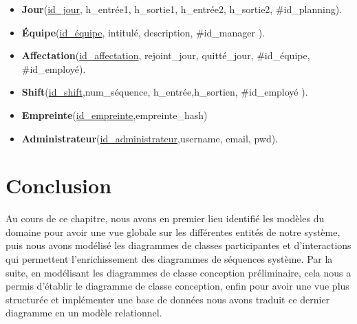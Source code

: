 \begin{itemize}
    \item [\textbullet]\textbf{Jour}(\underline{id\_jour}, h\_entrée1, h\_sortie1, h\_entrée2, h\_sortie2, \#id\_planning).
    
    \item [\textbullet]\textbf{Équipe}(\underline{id\_équipe}, intitulé, description, \#id\_manager ).
    
    \item [\textbullet]\textbf{Affectation}(\underline{id\_affectation}, rejoint\_jour, quitté\_jour, \#id\_équipe, \#id\_employé).
    
    \item [\textbullet]\textbf{Shift}(\underline{id\_shift},num\_séquence, h\_entrée,h\_sortien, \#id\_employé ).
    
    \item [\textbullet]\textbf{Empreinte}(\underline{id\_empreinte},empreinte\_hash)
    
    \item [\textbullet]\textbf{Administrateur}(\underline{id\_administrateur},username, email, pwd).
\end{itemize}


\section{Conclusion}
Au cours de ce chapitre, nous avons en premier lieu identifié les modèles du domaine pour avoir une vue globale sur les différentes entités de notre système, puis nous avons modélisé les diagrammes de classes participantes et d’interactions qui permettent l’enrichissement des diagrammes de séquences système. Par la suite, en modélisant les diagrammes de classe conception préliminaire, cela nous a permis d’établir le diagramme de classe conception, enfin pour avoir une vue plus structurée et implémenter une base de données nous avons traduit ce dernier diagramme en un modèle relationnel. 
